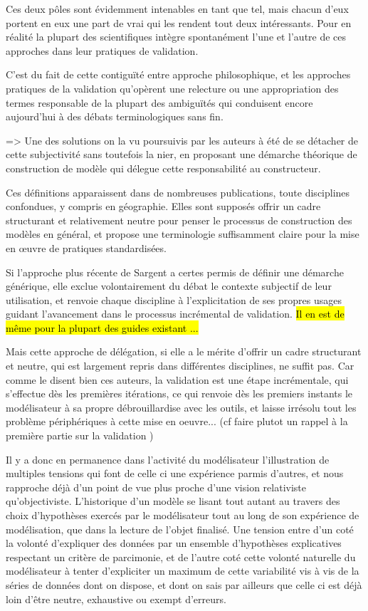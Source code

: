 Ces deux pôles sont évidemment intenables en tant que tel, mais chacun d'eux portent en eux une part de vrai qui les rendent tout deux intéressants. Pour \textcite{Kleindorfer1998} en réalité la plupart des scientifiques intègre spontanément l'une et l'autre de ces approches dans leur pratiques de validation.

C'est du fait de cette contiguïté entre approche philosophique, et les approches pratiques de la validation qu'opèrent une relecture ou une appropriation des termes responsable de la plupart des ambiguïtés qui conduisent encore aujourd'hui à des débats terminologiques sans fin. \autocite{David2009}

=> Une des solutions on la vu poursuivis par les auteurs à été de se détacher de cette subjectivité sans toutefois la nier, en proposant une démarche théorique de construction de modèle qui délegue cette responsabilité au constructeur.

Ces définitions apparaissent dans de nombreuses publications, toute disciplines confondues, y compris en géographie. Elles sont supposés offrir un cadre structurant et relativement neutre pour penser le processus de construction des modèles en général, et propose une terminologie suffisamment claire pour la mise en œuvre de pratiques standardisées. 

Si l'approche plus récente de Sargent a certes permis de définir une démarche générique, elle exclue volontairement du débat le contexte subjectif de leur utilisation, et renvoie chaque discipline à l'explicitation de ses propres usages guidant l'avancement dans le processus incrémental de validation. \hl{Il en est de même pour la plupart des guides existant ...}

Mais cette approche de délégation, si elle a le mérite d'offrir un cadre structurant et neutre, qui est largement repris dans différentes disciplines, ne suffit pas. Car comme le disent bien ces auteurs, la validation est une étape incrémentale, qui s'effectue dès les premières itérations, ce qui renvoie dès les premiers instants le modélisateur à sa propre débrouillardise avec les outils, et laisse irrésolu tout les problème périphériques à cette mise en oeuvre... (cf faire plutot un rappel à la première partie sur la validation ) 


Il y a donc en permanence dans l'activité du modélisateur l'illustration de multiples tensions qui font de celle ci une expérience parmis d'autres, et nous rapproche déjà d'un point de vue plus proche d'une vision relativiste qu'objectiviste. L'historique d'un modèle se lisant tout autant au travers des choix d'hypothèses exercés par le modélisateur tout au long de son expérience de modélisation, que dans la lecture de l'objet finalisé. Une tension entre d'un coté la volonté d'expliquer des données par un ensemble d'hypothèses explicatives respectant un critère de parcimonie, et de l'autre coté cette volonté naturelle du modélisateur à tenter d'expliciter un maximum de cette variabilité vis à vis de la séries de données dont on dispose, et dont on sais par ailleurs que celle ci est déjà loin d'être neutre, exhaustive ou exempt d'erreurs.


